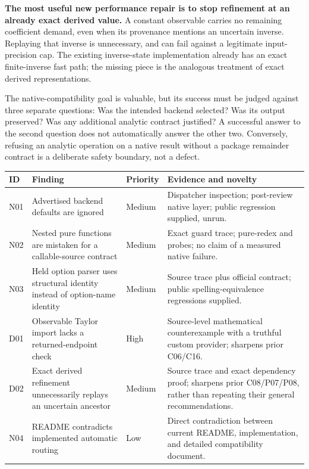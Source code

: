 \documentclass[11pt,letterpaper]{article}
\newcommand{\code}[1]{\texttt{\detokenize{#1}}}
\begin{document}
\textbf{The most useful new performance repair is to stop refinement at an already exact derived value.} A constant observable carries no remaining coefficient demand, even when its provenance mentions an uncertain inverse. Replaying that inverse is unnecessary, and can fail against a legitimate input-precision cap. The existing inverse-state implementation already has an exact finite-inverse fast path; the missing piece is the analogous treatment of exact derived representations.

The native-compatibility goal is valuable, but its success must be judged against three separate questions: Was the intended backend selected? Was its output preserved? Was any additional analytic contract justified? A successful answer to the second question does not automatically answer the other two. Conversely, refusing an analytic operation on a native result without a package remainder contract is a deliberate safety boundary, not a defect.

\begin{longtable}{@{}P{0.52in}P{2.20in}P{0.68in}P{2.86in}@{}}
\toprule
ID & Finding & Priority & Evidence and novelty\\\midrule\endhead
N01 & Advertised backend defaults are ignored & Medium & Dispatcher inspection; post-review native layer; public regression supplied, unrun.\\
N02 & Nested pure functions are mistaken for a callable-source contract & Medium & Exact guard trace; pure-redex and \code{Root} probes; no claim of a measured native failure.\\
N03 & Held option parser uses structural identity instead of option-name identity & Medium & Source trace plus official \code{OptionValue} contract; public spelling-equivalence regressions supplied.\\
D01 & Observable Taylor import lacks a returned-endpoint check & High & Source-level mathematical counterexample with a truthful custom provider; sharpens prior C06/C16.\\
D02 & Exact derived refinement unnecessarily replays an uncertain ancestor & Medium & Source trace and exact dependency proof; sharpens prior C08/P07/P08, rather than repeating their general recommendations.\\
N04 & README contradicts implemented automatic routing & Low & Direct contradiction between current README, implementation, and detailed compatibility document.\\
\bottomrule
\end{longtable}
\end{document}
